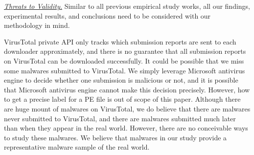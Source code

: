 \textit{\underline{Threats to Validity.}}
Similar to all previous empirical study works, all our findings, experimental results, 
and conclusions need to be considered with our methodology in mind. 

VirusTotal private API only tracks which submission reports are sent to each downloader approximately, 
and there is no guarantee that all submission reports on VirusTotal can be downloaded successfully. 
It could be possible that we miss some malwares submitted to VirusTotal. 
We simply leverage Microsoft antivirus engine to decide whether one submission is malicious or not, 
and it is possible that Microsoft antivirus engine cannot make this decision precisely. 
However, how to get a precise label for a PE file is out of scope of this paper.  
Although there are huge mount of malwares on VirusTotal, we do believe that there are malwares never submitted to VirusTotal, 
and there are malwares submitted much later than when they appear in the real world.
However, there are no conceivable ways to study these malwares. 
We believe that malwares in our study provide a representative malware sample of the real world. 

